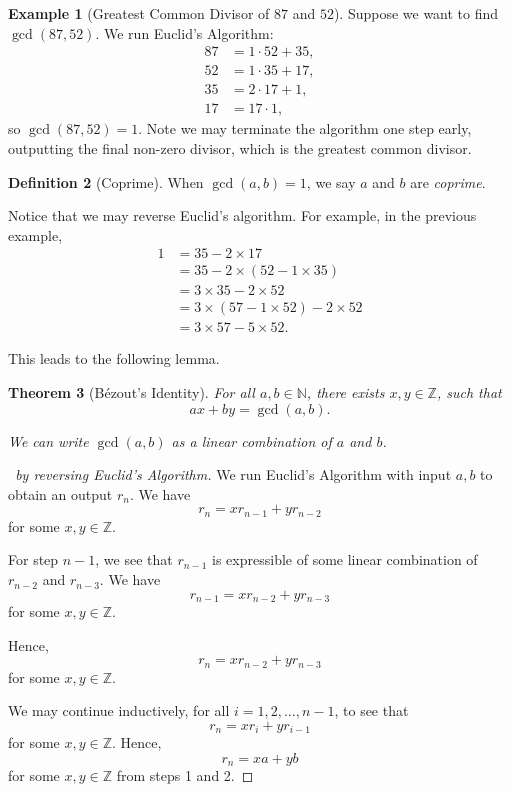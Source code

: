 \documentclass{article}
\newtheorem{theorem}{Theorem}[section]
\theoremstyle{definition}
\newtheorem{definition}[theorem]{Definition}
\newtheorem{example}[theorem]{Example}
\theoremstyle{remark}
\newcommand{\pqty}[1]{\left(#1\right)}
\newcommand{\NN}{\mathbb{N}}
\newcommand{\ZZ}{\mathbb{Z}}
\begin{document}
\begin{example}[Greatest Common Divisor of \(87\) and \(52\)]
    Suppose we want to find \(\gcd\pqty{87, 52}\). We run Euclid's Algorithm:
    \begin{align*}
        87 &= 1 \cdot 52 + 35, \\
        52 &= 1 \cdot 35 + 17, \\
        35 &= 2 \cdot 17 + \boxed{1}, \\
        17 &= 17 \cdot \boxed{1},
    \end{align*}
    so \(\gcd\pqty{87, 52} = 1\). Note we may terminate the algorithm one step early, outputting the final non-zero divisor, which is the greatest common divisor.
\end{example}

\begin{definition}[Coprime]
    When \(\gcd\pqty{a, b} = 1\), we say \(a\) and \(b\) are \emph{coprime}.
\end{definition}

Notice that we may reverse Euclid's algorithm. For example, in the previous example,
\begin{align*}
    1 &= 35 - 2 \times 17 \\
       &= 35 - 2 \times \pqty{52 - 1 \times 35} \\
       &= 3 \times 35 - 2 \times 52 \\
       &= 3 \times \pqty{57 - 1 \times 52} - 2 \times 52 \\
       &= 3 \times 57 - 5 \times 52.
\end{align*}

This leads to the following lemma.

\begin{theorem}[B\'{e}zout's Identity]
    For all \(a, b \in \NN\), there exists \(x, y \in \ZZ\), such that
    \[
        ax + by = \gcd\pqty{a, b}.
    \]

    We can write \(\gcd\pqty{a, b}\) as a linear combination of \(a\) and \(b\).
\end{theorem}

\begin{proof}[\proofname\ by reversing Euclid's Algorithm]
    We run Euclid's Algorithm with input \(a, b\) to obtain an output \(r_n\). We have
    \[
        r_n = x r_{n - 1} + y r_{n - 2}
    \]
    for some \(x, y \in \ZZ\).

    For step \(n - 1\), we see that \(r_{n - 1}\) is expressible of some linear combination of \(r_{n - 2}\) and \(r_{n - 3}\). We have
    \[
        r_{n - 1} = x r_{n - 2} + y r_{n - 3}
    \]
    for some \(x, y \in \ZZ\).

    Hence,
    \[
        r_n = x r_{n - 2} + y r_{n - 3}
    \]  
    for some \(x, y \in \ZZ\).

    We may continue inductively, for all \(i = 1, 2, \ldots, n - 1\), to see that
    \[
        r_n = x r_i + y r_{i - 1}
    \]
    for some \(x, y \in \ZZ\). Hence,
    \[
        r_{n} = xa + yb
    \]
    for some \(x, y \in \ZZ\) from steps 1 and 2.
\end{proof}
\end{document}

